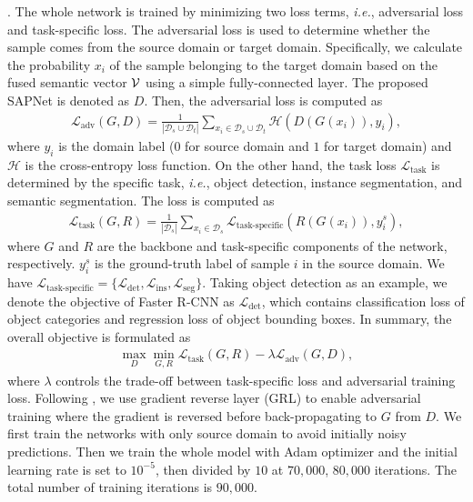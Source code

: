 \documentclass[runningheads]{llncs}
\def\ie{{\em i.e.}}
\begin{document}
{.}
The whole network is trained by minimizing two loss terms, \ie, adversarial loss and task-specific loss. The adversarial loss is used to determine whether the sample comes from the source domain or target domain. Specifically, we calculate the probability $x_i$ of the sample belonging to the target domain based on the fused semantic vector ${\cal V}$ using a simple fully-connected layer. The proposed SAPNet is denoted as $D$. Then, the adversarial loss is computed as
\begin{align}
\mathcal{L}_{\text{adv}}(G, D) =\frac{1}{|\mathcal{D}_s \cup \mathcal{D}_t|} \sum_{x_i \in \mathcal{D}_s \cup \mathcal{D}_t}\mathcal{H} (D(G(x_i)), y_i),
\end{align}
where $y_i$ is the domain label ($0$ for source domain and $1$ for target domain) and $\mathcal{H}$ is the cross-entropy loss function. On the other hand, the task loss $\mathcal{L}_{\text{task}}$ is determined by the specific task, \ie, object detection, instance segmentation, and semantic segmentation. The loss is computed as
\begin{align}
\mathcal{L}_{\text{task}}(G, R) =\frac{1}{|\mathcal{D}_s|} \sum_{x_i \in \mathcal{D}_s}\mathcal{L}_{\text{task-specific}}(R(G(x_i)), y_i^s),
\end{align}
where $G$ and $R$ are the backbone and task-specific components of the network, respectively. $y_i^s$ is the ground-truth label of sample $i$ in the source domain. We have $\mathcal{L}_{\text{task-specific}}=\{\mathcal{L}_{\text{det}},\mathcal{L}_{\text{ins}},\mathcal{L}_{\text{seg}}\}$. Taking object detection as an example, we denote the objective of Faster R-CNN as $\mathcal{L}_{\text{det}}$, which contains classification loss of object categories and regression loss of object bounding boxes. In summary, the overall objective is formulated as
\begin{align}
\max_{D}\min_{G, R}\mathcal{L}_{\text{task}}(G, R) - \lambda\mathcal{L}_{\text{adv}}(G, D),
\label{euq:loss}
\end{align}
where $\lambda$ controls the trade-off between task-specific loss and adversarial training loss. Following \cite{DBLP:conf/cvpr/Chen0SDG18,DBLP:conf/cvpr/SaitoUHS19}, we use gradient reverse layer (GRL) \cite{DBLP:conf/icml/GaninL15} to enable adversarial training where the gradient is reversed before back-propagating to $G$ from $D$. We first train the networks with only source domain to avoid initially noisy predictions. Then we train the whole model with Adam optimizer and the initial learning rate is set to $10^{-5}$, then divided by $10$ at $70,000$, $80,000$ iterations. The total number of training iterations is $90,000$.
\end{document}
